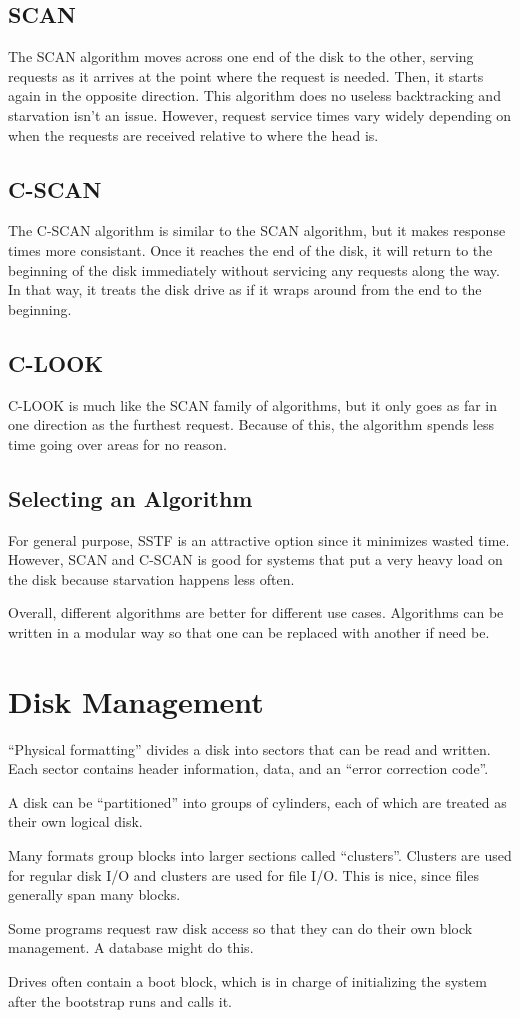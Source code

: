 \documentclass{article}
\begin{document}
\subsection{SCAN}
The SCAN algorithm moves across one end of the disk to the other, serving
requests as it arrives at the point where the request is needed. Then, it starts
again in the opposite direction. This algorithm does no useless backtracking
and starvation isn't an issue. However, request service times vary widely
depending on when the requests are received relative to where the head is.

\subsection{C-SCAN}
The C-SCAN algorithm is similar to the SCAN algorithm, but it makes response
times more consistant. Once it reaches the end of the disk, it will return
to the beginning of the disk immediately without servicing any requests along
the way. In that way, it treats the disk drive as if it wraps around from the
end to the beginning.

\subsection{C-LOOK}
C-LOOK is much like the SCAN family of algorithms, but it only goes as far
in one direction as the furthest request. Because of this, the algorithm spends
less time going over areas for no reason.

\subsection{Selecting an Algorithm}
For general purpose, SSTF is an attractive option since it minimizes wasted
time. However, SCAN and C-SCAN is good for systems that put a very heavy load
on the disk because starvation happens less often.

Overall, different algorithms are better for different use cases. Algorithms
can be written in a modular way so that one can be replaced with another if
need be.

\section{Disk Management}
``Physical formatting'' divides a disk into sectors that can be read and
written. Each sector contains header information, data, and an ``error
correction code''.

A disk can be ``partitioned'' into groups of cylinders, each of which are
treated as their own logical disk.

Many formats group blocks into larger sections called ``clusters''. Clusters
are used for regular disk I/O and clusters are used for file I/O. This is
nice, since files generally span many blocks.

Some programs request raw disk access so that they can do their own block
management. A database might do this.

Drives often contain a boot block, which is in charge of initializing the
system after the bootstrap runs and calls it.
\end{document}
